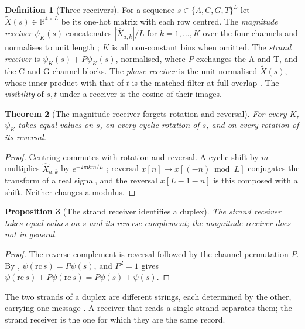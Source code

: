 \documentclass[11pt,twocolumn,a4paper]{article}
\theoremstyle{plain}
\newtheorem{theorem}{Theorem}[section]
\newtheorem{proposition}[theorem]{Proposition}
\theoremstyle{definition}
\newtheorem{definition}[theorem]{Definition}
\theoremstyle{remark}
\begin{document}
\begin{definition}[Three receivers]
\label{def:receivers}
For a sequence $s\in\{A,C,G,T\}^L$ let $\tilde X(s)\in\mathbb R^{4\times L}$ be
its one-hot matrix with each row centred. The \emph{magnitude receiver}
$\psi_K(s)$ concatenates $|\hat X_{a,k}|/L$ for $k=1,\dots,K$ over the four
channels and normalises to unit length \citep{voss1992,anastassiou2001}; $K$
is all non-constant bins when omitted. The \emph{strand receiver} is
$\psi_K(s)+P\psi_K(s)$, normalised, where $P$ exchanges the A and T, and the C
and G channel blocks. The \emph{phase receiver} is the unit-normalised
$\tilde X(s)$, whose inner product with that of $t$ is the matched filter at
full overlap \citep{turin1960}. The \emph{visibility} of $s,t$ under a receiver
is the cosine of their images.
\end{definition}

\begin{theorem}[The magnitude receiver forgets rotation and reversal]
\label{thm:dihedral}
For every $K$, $\psi_K$ takes equal values on $s$, on every cyclic rotation of
$s$, and on every rotation of its reversal.
\end{theorem}

\begin{proof}
Centring commutes with rotation and reversal. A cyclic shift by $m$ multiplies
$\hat X_{a,k}$ by $e^{-2\pi\mathrm i km/L}$ \citep{oppenheim2009}; reversal
$x[n]\mapsto x[(-n)\bmod L]$ conjugates the transform of a real signal, and the
reversal $x[L-1-n]$ is this composed with a shift. Neither changes a modulus.
\end{proof}

\begin{proposition}[The strand receiver identifies a duplex]
\label{prop:strand}
The strand receiver takes equal values on $s$ and its reverse complement; the
magnitude receiver does not in general.
\end{proposition}

\begin{proof}
The reverse complement is reversal followed by the channel permutation $P$. By
, $\psi(\mathrm{rc}\,s)=P\psi(s)$, and $P^2=1$ gives
$\psi(\mathrm{rc}\,s)+P\psi(\mathrm{rc}\,s)=P\psi(s)+\psi(s)$.
\end{proof}

The two strands of a duplex are different strings, each determined by the other,
carrying one message \citep{watson1953,chargaff1950}. A receiver that reads a
single strand separates them; the strand receiver is the one for which they are
the same record.
\end{document}
